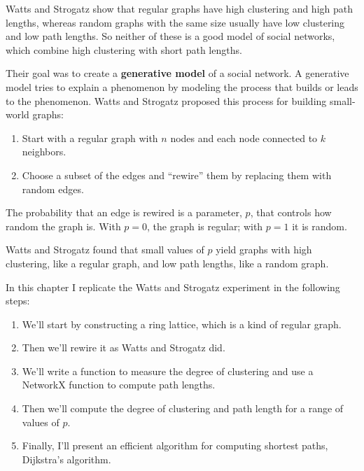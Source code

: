 \documentclass[12pt]{book}
\theoremstyle{exercise}
\begin{document}
Watts and Strogatz show that regular graphs
have high clustering and high path lengths, whereas
random graphs with the same size usually have low clustering
and low path lengths.  So neither of these is a good model of
social networks, which combine high clustering with
short path lengths.

Their goal was to create a {\bf generative model} of a social
network.  A generative model tries to explain a phenomenon by
modeling the process that builds or leads to the phenomenon.
Watts and Strogatz proposed this process for building
small-world graphs:

\begin{enumerate}

\item Start with a regular graph with $n$ nodes and each node
  connected to $k$ neighbors.

\item Choose a subset of the edges and ``rewire'' them by
  replacing them with random edges.

\end{enumerate}

The probability that an edge is rewired is a parameter, $p$,
that controls how random the graph is.  With $p=0$, the graph
is regular; with $p=1$ it is random.

Watts and Strogatz found that small values of $p$ yield graphs
with high clustering, like a regular graph, and low path
lengths, like a random graph.

In this chapter I replicate the Watts and Strogatz experiment
in the following steps:

\begin{enumerate}

\item We'll start by constructing a ring lattice, which is a kind
of regular graph.

\item Then we'll rewire it as Watts and Strogatz did.

\item We'll write a function to measure the degree of clustering
and use a NetworkX function to compute path lengths.

\item Then we'll compute the degree of clustering and path length for
a range of values of $p$.

\item Finally, I'll present an efficient algorithm for computing shortest
paths, Dijkstra's algorithm.

\end{enumerate}
\end{document}
